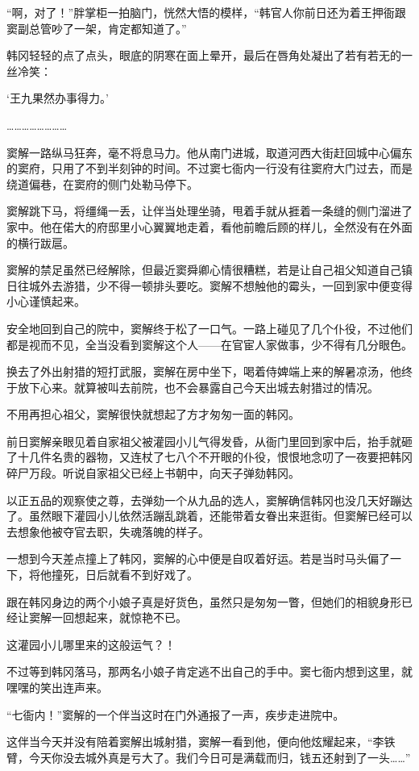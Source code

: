 “啊，对了！”胖掌柜一拍脑门，恍然大悟的模样，“韩官人你前日还为着王押衙跟窦副总管吵了一架，肯定都知道了。”

韩冈轻轻的点了点头，眼底的阴寒在面上晕开，最后在唇角处凝出了若有若无的一丝冷笑：

‘王九果然办事得力。’

……………………

窦解一路纵马狂奔，毫不将息马力。他从南门进城，取道河西大街赶回城中心偏东的窦府，只用了不到半刻钟的时间。不过窦七衙内一行没有往窦府大门过去，而是绕道偏巷，在窦府的侧门处勒马停下。

窦解跳下马，将缰绳一丢，让伴当处理坐骑，甩着手就从捱着一条缝的侧门溜进了家中。他在偌大的府邸里小心翼翼地走着，看他前瞻后顾的样儿，全然没有在外面的横行跋扈。

窦解的禁足虽然已经解除，但最近窦舜卿心情很糟糕，若是让自己祖父知道自己镇日往城外去游猎，少不得一顿排头要吃。窦解不想触他的霉头，一回到家中便变得小心谨慎起来。

安全地回到自己的院中，窦解终于松了一口气。一路上碰见了几个仆役，不过他们都是视而不见，全当没看到窦解这个人——在官宦人家做事，少不得有几分眼色。

换去了外出射猎的短打武服，窦解在房中坐下，喝着侍婢端上来的解暑凉汤，他终于放下心来。就算被叫去前院，也不会暴露自己今天出城去射猎过的情况。

不用再担心祖父，窦解很快就想起了方才匆匆一面的韩冈。

前日窦解亲眼见着自家祖父被灌园小儿气得发昏，从衙门里回到家中后，抬手就砸了十几件名贵的器物，又连杖了七八个不开眼的仆役，恨恨地念叨了一夜要把韩冈碎尸万段。听说自家祖父已经上书朝中，向天子弹劾韩冈。

以正五品的观察使之尊，去弹劾一个从九品的选人，窦解确信韩冈也没几天好蹦达了。虽然眼下灌园小儿依然活蹦乱跳着，还能带着女眷出来逛街。但窦解已经可以去想象他被夺官去职，失魂落魄的样子。

一想到今天差点撞上了韩冈，窦解的心中便是自叹着好运。若是当时马头偏了一下，将他撞死，日后就看不到好戏了。

跟在韩冈身边的两个小娘子真是好货色，虽然只是匆匆一瞥，但她们的相貌身形已经让窦解一回想起来，就惊艳不已。

这灌园小儿哪里来的这般运气？！

不过等到韩冈落马，那两名小娘子肯定逃不出自己的手中。窦七衙内想到这里，就嘿嘿的笑出连声来。

“七衙内！”窦解的一个伴当这时在门外通报了一声，疾步走进院中。

这伴当今天并没有陪着窦解出城射猎，窦解一看到他，便向他炫耀起来，“李铁臂，今天你没去城外真是亏大了。我们今日可是满载而归，钱五还射到了一头……”

